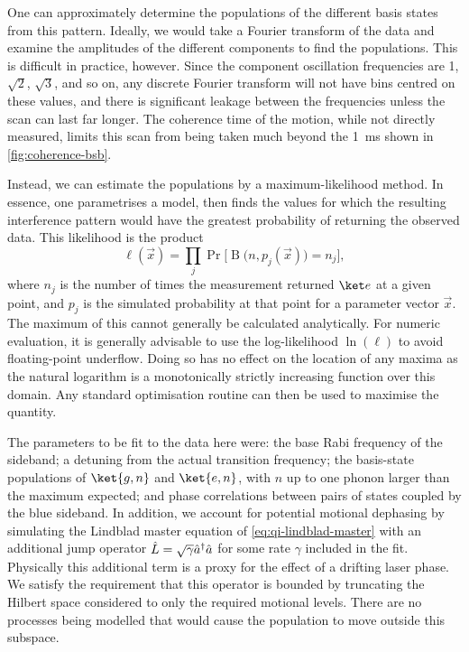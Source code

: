 One can approximately determine the populations of the different basis states from this pattern.
Ideally, we would take a Fourier transform of the data and examine the amplitudes of the different components to find the populations.
This is difficult in practice, however.
Since the component oscillation frequencies are 1, $\sqrt2$, $\sqrt3$, and so on, any discrete Fourier transform will not have bins centred on these values, and there is significant leakage between the frequencies unless the scan can last far longer.
The coherence time of the motion, while not directly measured, limits this scan from being taken much beyond the \qty{1}{\milli\s} shown in \cref{fig:coherence-bsb}.

Instead, we can estimate the populations by a maximum-likelihood method.
In essence, one parametrises a model, then finds the values for which the resulting interference pattern would have the greatest probability of returning the observed data.
This likelihood is the product
\begin{equation}
\ell(\vec x) = \prod_j \Pr\bigl[\operatorname B\bigl(n, p_j(\vec x)\bigr) = n_j\bigr],
\end{equation}
where $n_j$ is the number of times the measurement returned $\ket e$ at a given point, and $p_j$ is the simulated probability at that point for a parameter vector $\vec x$.
The maximum of this cannot generally be calculated analytically.
For numeric evaluation, it is generally advisable to use the log-likelihood $\ln(\ell)$ to avoid floating-point underflow.
Doing so has no effect on the location of any maxima as the natural logarithm is a monotonically strictly increasing function over this domain.
Any standard optimisation routine can then be used to maximise the quantity.

The parameters to be fit to the data here were: the base Rabi frequency of the sideband; a detuning from the actual transition frequency; the basis-state populations of $\ket{g,n}$ and $\ket{e,n}$, with $n$ up to one phonon larger than the maximum expected; and phase correlations between pairs of states coupled by the blue sideband.
In addition, we account for potential motional dephasing by simulating the Lindblad master equation of \cref{eq:qi-lindblad-master} with an additional jump operator $\hat{L} = \sqrt\gamma \hat{a}^\dagger\hat{a}$ for some rate $\gamma$ included in the fit.
Physically this additional term is a proxy for the effect of a drifting laser phase.
We satisfy the requirement that this operator is bounded by truncating the Hilbert space considered to only the required motional levels.
There are no processes being modelled that would cause the population to move outside this subspace.

